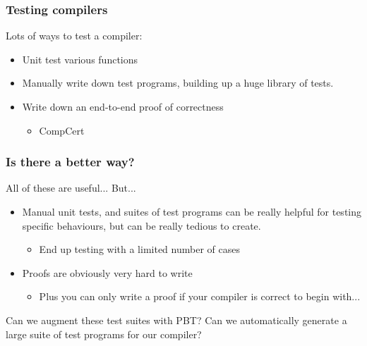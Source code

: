 \documentclass{beamer}
\begin{document}
\begin{frame}
  \frametitle{Testing compilers}

  Lots of ways to test a compiler:

  \begin{itemize}
  \item Unit test various functions
  \item Manually write down test programs, building up a huge library
    of tests.
  \item Write down an end-to-end proof of correctness
    \begin{itemize}
    \item CompCert
    \end{itemize}
  \end{itemize}


\end{frame}

\begin{frame}
  \frametitle{Is there a better way?}

  All of these are useful... But...
  
  \begin{itemize}
  \item Manual unit tests, and suites of test programs can be really
    helpful for testing specific behaviours, but can be really tedious
    to create.
    \begin{itemize}
    \item End up testing with a limited number of cases
    \end{itemize}
  \item Proofs are obviously very hard to write
    \begin{itemize}
    \item Plus you can only write a proof if your compiler is correct
      to begin with... %
    \end{itemize}
  \end{itemize}

  Can we augment these test suites with PBT? Can we automatically
  generate a large suite of test programs for our compiler?

\end{frame}
\end{document}
